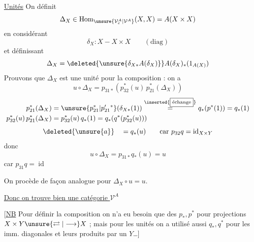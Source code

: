\uline{Unités} On définit
\[
\Delta_X\in\operatorname{Hom}_{\unsure{\mathcal V_c^A|\mathcal V^A}}(X,X)=A(X\times X)
\]
en considérant
\[
\delta_X:X-X\times X\qquad(\mathrm{diag})
\]
et définissant
\[
\Delta_X=\deleted{\unsure{\delta_{X*}A(\delta_X)}}A(\delta_X)_*(1_{A(X)})
\]
Prouvons que $\Delta_X$ est une unité  pour la
composition : on a
\[
u\circ\Delta_X=p_{31*}(p_{32}^*(u)\,p_{21}^*(\Delta_X))
\]
\[
\begin{aligned}
p_{21}^*(\Delta_X)&=\unsure{p_{21}^*|p'_{21}{}^*}(\delta_{X*}(1))
\overset{\text{\inserted{\fbox{échange}}}}=q_*(p^*(1))=q_*(1)\\
p_{32}^*(u)\,p_{21}^*(\Delta_X)&=p_{32}^*(u)\,q_*(1)=q_*(q^*(p_{32}^*(u)))
\end{aligned}
\]
\[
\deleted{\unsure{a}}\quad=q_*(u)\qquad\text{car }p_{32}q=\operatorname{id}_{X\times Y}
\]
donc
\[
u\circ\Delta_X=p_{31*}q_*(u)=u
\]
car  $p_{31}q=\operatorname{id}$

On procède de façon analogue pour $\Delta_X\circ u=u$.

\uline{Donc on trouve bien une catégorie $\mathcal V^A$}

[\uline{NB} Pour définir la composition on n'a eu besoin que
des $p_*,p^*$ pour projections $X\times Y\unsure{\rightleftarrows|\longrightarrow}X$ ; mais pour
  les unités on a utilisé aussi $q_*,q^*$ pour
les imm. diagonales et leurs produits par un $Y$\ldots]
